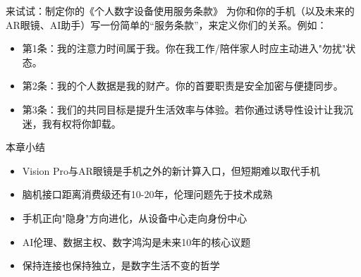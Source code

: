 \begin{tcbpractice}{来试试：制定你的《个人数字设备使用服务条款》}
为你和你的手机（以及未来的AR眼镜、AI助手）写一份简单的“服务条款”，来定义你们的关系。例如：

\begin{itemize}
  \item 第1条：我的注意力时间属于我。你在我工作/陪伴家人时应主动进入"勿扰"状态。
  \item 第2条：我的个人数据是我的财产。你的首要职责是安全加密与便捷同步。
  \item 第3条：我们的共同目标是提升生活效率与体验。若你通过诱导性设计让我沉迷，我有权将你卸载。
\end{itemize}

\end{tcbpractice}

\begin{tcbsummary}{本章小结}
\begin{itemize}
  \item Vision Pro与AR眼镜是手机之外的新计算入口，但短期难以取代手机
  \item 脑机接口距离消费级还有10-20年，伦理问题先于技术成熟
  \item 手机正向"隐身"方向进化，从设备中心走向身份中心
  \item AI伦理、数据主权、数字鸿沟是未来10年的核心议题
  \item 保持连接也保持独立，是数字生活不变的哲学
\end{itemize}

\end{tcbsummary}
